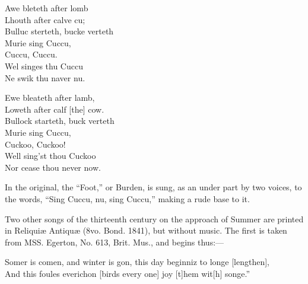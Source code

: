 





\settowidth{\versewidth}{Bulluc sterteth, bucke verteth}
\begin{dcverse}
\begin{patverse}
Awe bleteth after lomb\\
Lhouth after calve cu;\\
Bulluc sterteth, bucke verteth\\
Murie sing Cuccu,\\
Cuccu, Cuccu.\\
Wel singes thu Cuccu\\
Ne swik thu naver nu.
\end{patverse}

\begin{patverse}
Ewe bleateth after lamb,\\
Loweth after calf [the] cow.\\
Bullock starteth, buck verteth \\
Murie sing Cuccu,\\
Cuckoo, Cuckoo!\\
Well sing’st thou Cuckoo\\
Nor cease thou never now.
\end{patverse}
\end{dcverse}

In the original, the “Foot,” or Burden, is sung, as an under part by two 
voices, to the words, “Sing Cuccu, nu, sing Cuccu,” making a rude base to it.

Two other songs of the thirteenth century on the approach of Summer are
printed in Reliquiæ Antiquæ (8vo. Bond. 1841), but without music. The first
is taken from MSS. Egerton, No. 613, Brit. Mus., and begins thus:—

\settowidth{\versewidth}{“Somer is comen, and winter is gon, this day beginniz to longe [lengthen],}

\begin{scverse}
Somer is comen, and winter is gon, this day beginniz to longe [lengthen],\\
And this foules everichon [birds every one] joy [t]hem wit[h] songe.”
\end{scverse}

